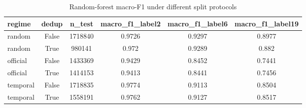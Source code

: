 \begin{table}[htbp]
\centering
\caption{Random-forest macro-F1 under different split protocols}
\label{tab:split_inflation}
\begin{tabular}{lccccc}
\toprule
regime & dedup & n\_test & macro\_f1\_label2 & macro\_f1\_label6 & macro\_f1\_label19 \\
\midrule
random & False & 1718840 & 0.9726 & 0.9297 & 0.8977 \\
random & True & 980141 & 0.972 & 0.9289 & 0.882 \\
official & False & 1433369 & 0.9429 & 0.8452 & 0.7441 \\
official & True & 1414153 & 0.9413 & 0.8441 & 0.7456 \\
temporal & False & 1718835 & 0.9774 & 0.9113 & 0.8504 \\
temporal & True & 1558191 & 0.9762 & 0.9127 & 0.8517 \\
\bottomrule
\end{tabular}
\end{table}